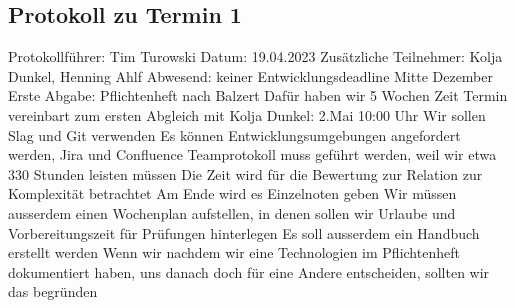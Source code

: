 \subsection{Protokoll zu Termin 1}
Protokollführer: Tim Turowski \newline
Datum: 19.04.2023 \newline
Zusätzliche Teilnehmer: Kolja Dunkel, Henning Ahlf \newline
Abwesend: keiner \newline \newline
Entwicklungsdeadline Mitte Dezember \newline
Erste Abgabe: Pflichtenheft nach Balzert \newline
Dafür haben wir 5 Wochen Zeit \newline
Termin vereinbart zum ersten Abgleich mit Kolja Dunkel: 2.Mai 10:00 Uhr \newline
Wir sollen Slag und Git verwenden \newline
Es können Entwicklungsumgebungen angefordert werden, Jira und Confluence \newline
Teamprotokoll muss geführt werden, weil wir etwa 330 Stunden leisten müssen \newline
Die Zeit wird für die Bewertung zur Relation zur Komplexität betrachtet \newline
Am Ende wird es Einzelnoten geben \newline
Wir müssen ausserdem einen Wochenplan aufstellen, in denen sollen wir Urlaube und Vorbereitungszeit für Prüfungen hinterlegen \newline
Es soll ausserdem ein Handbuch erstellt werden \newline
Wenn wir nachdem wir eine Technologien im Pflichtenheft dokumentiert haben, uns danach doch für eine Andere entscheiden, sollten wir das begründen 

